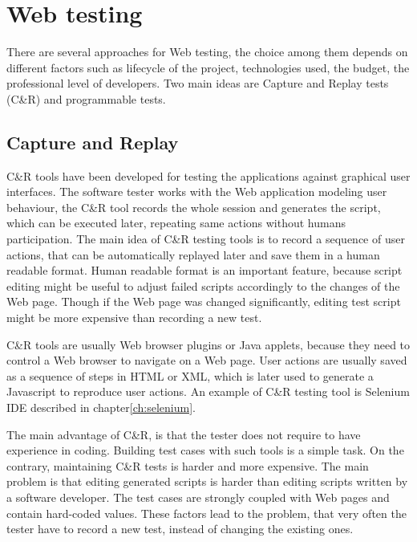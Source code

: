 	\chapter{Web testing}
	\label{ch:Webtesting}

		There are several approaches for Web testing, the choice among them depends on
		different factors such as lifecycle of the project, technologies used, the
		budget, the professional level of developers. Two main ideas are Capture and
		Replay tests (C\&R) and programmable tests.
		
		\section{Capture and Replay}
		\label{sec:captureReplay}
			C\&R tools have been developed for testing the applications against graphical user interfaces. 
			The software tester works with the Web application modeling user behaviour,
			the C\&R tool records the whole session and generates the
			script, which can be executed later,	repeating same actions without humans participation.
			  The main idea of C\&R
			testing tools is to record a sequence of user actions, that can be
			automatically replayed later and save them in a human readable format. Human
			readable format is an important feature, because script editing might
			 be useful to adjust failed scripts accordingly	to the changes of the Web page.
			 Though if the Web page was changed	significantly, editing test script might be more expensive than recording a
			new test\cite{CaptureReplay7}. 
			
C\&R tools are usually Web browser plugins or Java applets, because they
need to control a Web browser to navigate on a Web page. User actions are
usually saved as a sequence of steps in HTML or XML, which is later used to
generate a Javascript to reproduce user actions. An example of C\&R testing
tool is Selenium IDE described in chapter\ref{ch:selenium}.

The main advantage of C\&R, is that the tester does not
require to have experience in coding. Building test cases with such tools
is a simple task.
On the contrary, maintaining C\&R tests is harder and more
expensive\cite{CaptureReplay7}.
The main problem is that editing generated scripts is harder than editing
scripts written by a software developer. The test cases are strongly coupled
with Web pages and contain hard-coded values. These factors lead to the
problem, that very often the tester have to record a new test, instead of
changing the existing ones.

